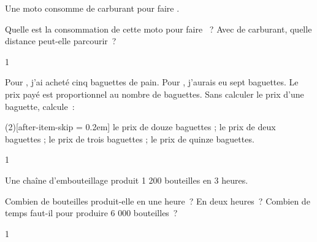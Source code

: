 \documentclass[a4paper,11pt]{report}
\begin{document}
\begin{exo}{
		Une moto consomme  de carburant pour faire .
\vspace{-0.3cm}
\begin{tasks}[after-item-skip = 0.2em]
\task  Quelle est la consommation de cette moto
	pour faire ~?
\task Avec  de carburant, quelle distance peut-elle parcourir~?
\end{tasks}
\vspace{-0.3cm}
}{1}\end{exo}

\begin{exo}{
		Pour , j'ai acheté cinq baguettes de
		pain. Pour , j'aurais eu sept baguettes.
Le prix payé est proportionnel au nombre de
baguettes.
Sans calculer le prix d'une baguette, calcule~:
\vspace{-0.4cm}
\begin{tasks}(2)[after-item-skip = 0.2em]
\task le prix de douze baguettes ;
\task le prix de deux baguettes ;
\task le prix de trois baguettes ;
\task le prix de quinze baguettes.
\end{tasks}
\vspace{-0.3cm}
}{1}\end{exo}


\begin{exo}{
Une chaîne d'embouteillage produit 1 200 bouteilles en 3 heures.
\begin{tasks}[after-item-skip = 0.2em]
\task Combien de bouteilles produit-elle en une heure~? En deux heures~?
\task Combien de temps faut-il pour produire 6 000 bouteilles~?
\end{tasks}
}{1}\end{exo}










\end{document}

